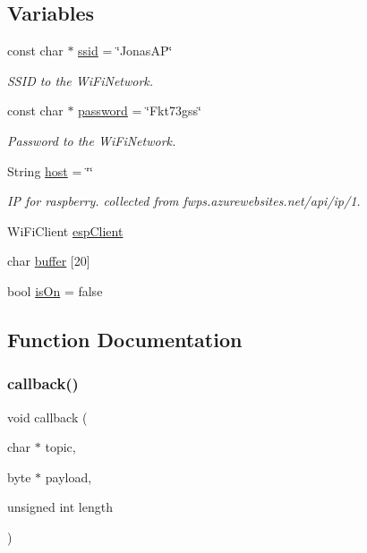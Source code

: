 \subsection*{Variables}
\begin{DoxyCompactItemize}
\item 
const char $\ast$ \mbox{\hyperlink{_poomba_8ino_a587ba0cb07f02913598610049a3bbb79}{ssid}} = \char`\"{}Jonas\+AP\char`\"{}
\begin{DoxyCompactList}\small\item\em S\+S\+ID to the Wi\+Fi\+Network. \end{DoxyCompactList}\item 
const char $\ast$ \mbox{\hyperlink{_poomba_8ino_aa4a2ebcb494493f648ae1e6975672575}{password}} = \char`\"{}Fkt73gss\char`\"{}
\begin{DoxyCompactList}\small\item\em Password to the Wi\+Fi\+Network. \end{DoxyCompactList}\item 
String \mbox{\hyperlink{_poomba_8ino_a2502b12b30261ef4dea2ff97a6b78cab}{host}} = \char`\"{}\char`\"{}
\begin{DoxyCompactList}\small\item\em IP for raspberry. collected from fwps.\+azurewebsites.\+net/api/ip/1. \end{DoxyCompactList}\item 
Wi\+Fi\+Client \mbox{\hyperlink{_poomba_8ino_abd77e757e4b3bb6f1e4b42b21ea9e040}{esp\+Client}}
\item 
char \mbox{\hyperlink{_poomba_8ino_a5819dbc2d305e99e930c734a0d28bc3b}{buffer}} \mbox{[}20\mbox{]}
\item 
bool \mbox{\hyperlink{_poomba_8ino_ae530c5af75c42fc2bd1fb588c38aa332}{is\+On}} = false
\end{DoxyCompactItemize}


\subsection{Function Documentation}
\mbox{\label{_poomba_8ino_ac3a129f66dc859e2b7279565f4e1de78}} 
\subsubsection{\texorpdfstring{callback()}{callback()}}
{\footnotesize\ttfamily void callback (\begin{DoxyParamCaption}\item[{char $\ast$}]{topic,  }\item[{byte $\ast$}]{payload,  }\item[{unsigned int}]{length }\end{DoxyParamCaption})}

